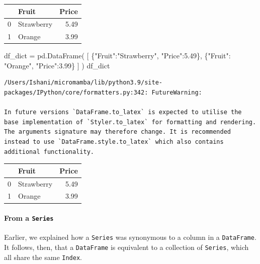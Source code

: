 \documentclass[
  letterpaper,
  DIV=11,
  numbers=noendperiod]{scrreprt}
\let\oldparagraph\paragraph
\renewcommand{\paragraph}[1]{\oldparagraph{#1}\mbox{}}
\newenvironment{Shaded}{\begin{snugshade}}{\end{snugshade}}
\newcommand{\FloatTok}[1]{\textcolor[rgb]{0.68,0.00,0.00}{#1}}
\newcommand{\NormalTok}[1]{\textcolor[rgb]{0.00,0.23,0.31}{#1}}
\newcommand{\OperatorTok}[1]{\textcolor[rgb]{0.37,0.37,0.37}{#1}}
\newcommand{\StringTok}[1]{\textcolor[rgb]{0.13,0.47,0.30}{#1}}
\begin{document}
\begin{tabular}{llr}
\toprule
{} &       Fruit &  Price \\
\midrule
0 &  Strawberry &   5.49 \\
1 &      Orange &   3.99 \\
\bottomrule
\end{tabular}

\begin{Shaded}
\begin{Highlighting}[]
\NormalTok{df\_dict }\OperatorTok{=}\NormalTok{ pd.DataFrame(}
\NormalTok{    [}
\NormalTok{        \{}\StringTok{"Fruit"}\NormalTok{:}\StringTok{"Strawberry"}\NormalTok{, }\StringTok{"Price"}\NormalTok{:}\FloatTok{5.49}\NormalTok{\}, }
\NormalTok{        \{}\StringTok{"Fruit"}\NormalTok{: }\StringTok{"Orange"}\NormalTok{, }\StringTok{"Price"}\NormalTok{:}\FloatTok{3.99}\NormalTok{\}}
\NormalTok{    ]}
\NormalTok{)}
\NormalTok{df\_dict}
\end{Highlighting}
\end{Shaded}

\begin{verbatim}
/Users/Ishani/micromamba/lib/python3.9/site-packages/IPython/core/formatters.py:342: FutureWarning:

In future versions `DataFrame.to_latex` is expected to utilise the base implementation of `Styler.to_latex` for formatting and rendering. The arguments signature may therefore change. It is recommended instead to use `DataFrame.style.to_latex` which also contains additional functionality.
\end{verbatim}

\begin{tabular}{llr}
\toprule
{} &       Fruit &  Price \\
\midrule
0 &  Strawberry &   5.49 \\
1 &      Orange &   3.99 \\
\bottomrule
\end{tabular}

\hypertarget{from-a-series}{%
\paragraph{\texorpdfstring{From a
\texttt{Series}}{From a Series}}\label{from-a-series}}

Earlier, we explained how a \texttt{Series} was synonymous to a column
in a \texttt{DataFrame}. It follows, then, that a \texttt{DataFrame} is
equivalent to a collection of \texttt{Series}, which all share the same
\texttt{Index}.
\end{document}
